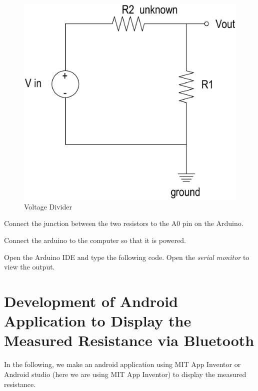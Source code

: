 \documentclass[journal,12pt,twocolumn]{IEEEtran}
\begin{document}
\begin{figure}
\centering
\includegraphics[width=\columnwidth]{./figs/voltage_divider.eps}
\caption{Voltage Divider}
\label{fig:voltage_divider}
\end{figure}
%

\begin{problem}
Connect the junction between the two resistors to  the A0 pin on the Arduino.
\end{problem}
%
\begin{problem}
Connect the arduino to the computer so that it is powered.
\end{problem}
%
\begin{problem}
Open the Arduino IDE and type the following code.  Open the {\em serial monitor} to view the output.
\end{problem}
%

%
\section{Development of Android Application to Display the Measured Resistance via Bluetooth}
In the following, we make an android application using MIT App Inventor or Android studio (here we are using MIT App Inventor) to display the measured resistance. 
\end{document}
